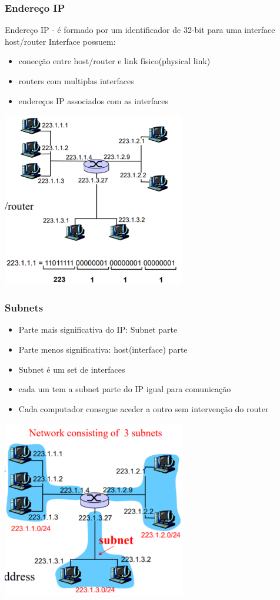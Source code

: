 \documentclass{article}
\begin{document}
\subsubsection{Endereço IP}
Endereço IP -  é formado por um identificador de  32-bit para uma interface host/router
Interface possuem:
\begin{itemize}
    \item conecção entre host/router e link físico(physical link)
    \item routers com multiplas interfaces
    \item endereços IP associados com as interfaces
\end{itemize}
\begin{center}
    \includegraphics[width=8cm]{images/RCOM16.png}
\end{center}

\subsubsection{Subnets}
\begin{itemize}
    \item Parte mais significativa do IP: Subnet parte
    \item Parte menos significativa: host(interface) parte
	\item Subnet é um set de interfaces
	\item cada um tem a subnet parte do IP igual para comunicação
	\item Cada computador consegue aceder a outro sem intervenção do router
\end{itemize}
\begin{center}
    \includegraphics[width=8cm]{images/RCOM17.png}
\end{center}
\end{document}
